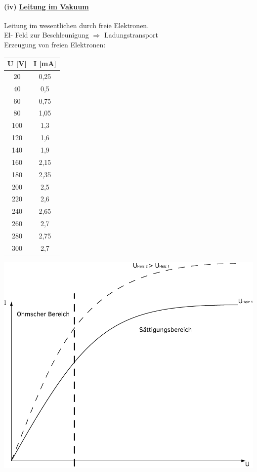 \documentclass[11pt]{article}
\begin{document}
	\paragraph{(iv) \underline{Leitung im Vakuum}} \hfill \break
	Leitung im wesentlichen durch freie Elektronen.\\
	El- Feld zur Beschleunigung $ \Rightarrow $ Ladungstransport\\
	\break
	Erzeugung von freien Elektronen: \\
	\begin{center}
		\begin{tabular}{ c | c  }
			U [V] & I [mA] \\ \hline
			20 & 0,25 \\
			40 & 0,5 \\
			60 & 0,75 \\
			80 & 1,05 \\
			100 & 1,3 \\
			120 & 1,6 \\
			140 & 1,9 \\
			160 & 2,15 \\
			180 & 2,35 \\
			200 & 2,5 \\
			220 & 2,6 \\
			240 & 2,65 \\
			260 & 2,7 \\
			280 & 2,75 \\
			300 & 2,7 \\
		\end{tabular}
	\end{center}
	
	\begin{center}
		\includegraphics[width=0.8\linewidth]{skizzen/15/VL07/VL7_1.png}
	\end{center}
\end{document}

